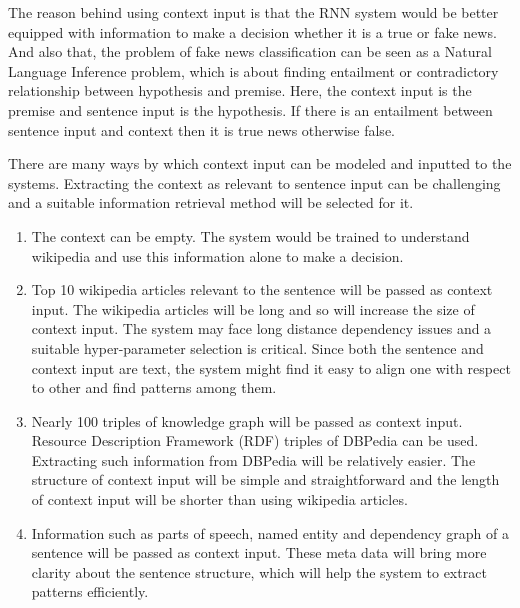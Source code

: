 \documentclass[a4paper, 11pt]{article}
\begin{document}
The reason behind using context input is that the RNN system would be better equipped with information to make a decision whether it is a true or fake news. And also that, the problem of fake news classification can be seen as a Natural Language Inference problem, which is about finding entailment or contradictory relationship between hypothesis and premise. Here, the context input is the premise and sentence input is the hypothesis. If there is an entailment between sentence input and context then it is true news otherwise false.

There are many ways by which context input can be modeled and inputted to the systems. \color{red}Extracting the context as relevant to sentence input can be challenging and a suitable information retrieval method will be selected for it.\color{black}

\begin{enumerate}
\item The context can be empty. The system would be trained to understand wikipedia and use this information alone to make a decision.
\item Top 10 wikipedia articles relevant to the sentence will be passed as context input. The wikipedia articles will be long and so will increase the size of context input. The system may face long distance dependency issues and a suitable hyper-parameter selection is critical. Since both the sentence and context input are text, the system might find it easy to align one with respect to other and find patterns among them. 
\item Nearly 100 triples of knowledge graph will be passed as context input. Resource Description Framework (RDF) triples of DBPedia can be used. Extracting such information from DBPedia will be relatively easier. The structure of context input will be simple and straightforward and the length of context input will be shorter than using wikipedia articles.  
\item Information such as parts of speech, named entity and dependency graph of a sentence will be passed as context input. These meta data will bring more clarity about the sentence structure, which will help the system to extract patterns efficiently. 
\end{enumerate}
\end{document}
